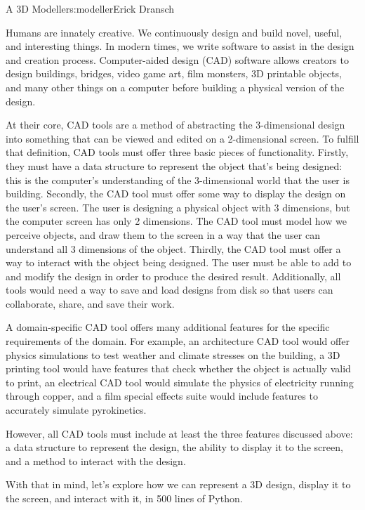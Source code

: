 \begin{aosachapter}{A 3D Modeller}{s:modeller}{Erick Dransch}

\label{introduction}

Humans are innately creative. We continuously design and build novel,
useful, and interesting things. In modern times, we write software to
assist in the design and creation process. Computer-aided design (CAD)
software allows creators to design buildings, bridges, video game art,
film monsters, 3D printable objects, and many other things on a computer
before building a physical version of the design.

At their core, CAD tools are a method of abstracting the 3-dimensional
design into something that can be viewed and edited on a 2-dimensional
screen. To fulfill that definition, CAD tools must offer three basic
pieces of functionality. Firstly, they must have a data structure to
represent the object that's being designed: this is the computer's
understanding of the 3-dimensional world that the user is building.
Secondly, the CAD tool must offer some way to display the design on the
user's screen. The user is designing a physical object with 3
dimensions, but the computer screen has only 2 dimensions. The CAD tool
must model how we perceive objects, and draw them to the screen in a way
that the user can understand all 3 dimensions of the object. Thirdly,
the CAD tool must offer a way to interact with the object being
designed. The user must be able to add to and modify the design in order
to produce the desired result. Additionally, all tools would need a way
to save and load designs from disk so that users can collaborate, share,
and save their work.

A domain-specific CAD tool offers many additional features for the
specific requirements of the domain. For example, an architecture CAD
tool would offer physics simulations to test weather and climate
stresses on the building, a 3D printing tool would have features that
check whether the object is actually valid to print, an electrical CAD
tool would simulate the physics of electricity running through copper,
and a film special effects suite would include features to accurately
simulate pyrokinetics.

However, all CAD tools must include at least the three features
discussed above: a data structure to represent the design, the ability
to display it to the screen, and a method to interact with the design.

With that in mind, let's explore how we can represent a 3D design,
display it to the screen, and interact with it, in 500 lines of Python.


\end{aosachapter}
